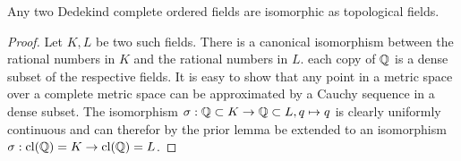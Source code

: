     \begin{proposition}
        Any two Dedekind complete ordered fields are isomorphic as topological fields.
    \end{proposition}
    \begin{proof}
        Let $K,L$ be two such fields. There is a canonical isomorphism between the rational numbers in $K$ and the rational numbers in $L$. each copy of $\mathbb{Q}$ is a dense subset of the respective fields. It is easy to show that any point in a metric space over a complete metric space can be approximated by a Cauchy sequence in a dense subset. The isomorphism $\sigma : \mathbb{Q}\subset K \rightarrow \mathbb{Q}\subset L, q \mapsto q$ is clearly uniformly continuous and can therefor by the prior lemma be extended to an isomorphism $\sigma : \mathrm{cl}(\mathbb{Q})=K \rightarrow\mathrm{cl}(\mathbb{Q})=L$.
    \end{proof}
